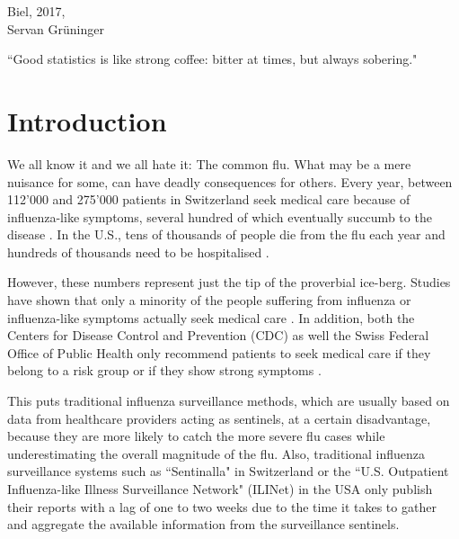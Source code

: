 \documentclass[11pt, a4paper,twoside]{report}\usepackage[]{graphicx}\usepackage[]{color}
\begin{document}
\begin{flushright}
Biel, 2017,\\
Servan Grüninger
\end{flushright}
\vfill

\begin{center}
``Good statistics is like strong coffee: bitter at times, but always sobering."
\end{center}

\thispagestyle{empty}
\cleardoublepage

\tableofcontents
\cleardoublepage


\chapter{Introduction}
\label{ch:intro}
\setcounter{page}{0}
We all know it and we all hate it: The common flu. What may be a mere nuisance for some, can have deadly consequences for others. Every year, between 112'000 and 275'000 patients in Switzerland seek medical care because of influenza-like symptoms, several hundred of which eventually succumb to the disease \citep{bag_lagebericht_2017}. In the U.S., tens of thousands of people die from the flu each year and hundreds of thousands need to be hospitalised \citep{rolfes_estimated_2016}.

However, these numbers represent just the tip of the proverbial ice-berg. Studies have shown that only a minority of the people suffering from influenza or influenza-like symptoms actually seek medical care \citep{goff_surveillance_2015}. In addition, both the Centers for Disease Control and Prevention (CDC) as well the Swiss Federal Office of Public Health only recommend patients to seek medical care if they belong to a risk group or if they show strong symptoms \citep{bag_grippe_2016,cdc_flu_2017}.

This puts traditional influenza surveillance methods, which are usually based on data from healthcare providers acting as sentinels, at a certain disadvantage, because they are more likely to catch the more severe flu cases while underestimating the overall magnitude of the flu. Also, traditional influenza surveillance systems such as ``Sentinalla" in Switzerland \citep{bag_influenza_2017, sentinella_2017} or the ``U.S. Outpatient Influenza-like Illness Surveillance Network" (ILINet) in the USA \citep{cdc_surveillance_2016} only publish their reports with a lag of one to two weeks due to the time it takes to gather and aggregate the available information from the surveillance sentinels.
\end{document}
